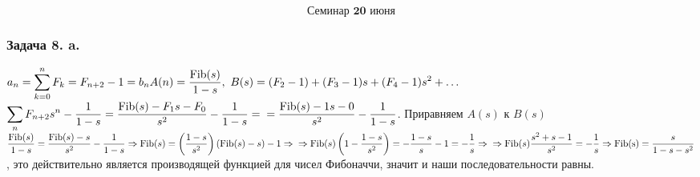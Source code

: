\documentclass[12pt, letterpaper, twoside]{article}
\begin{document}
\[\textbf{Семинар 20 июня}\]
\subsubsection*{Задача 8. a.}
$\displaystyle a_n = \sum_{k = 0}^{n} F_k = F_{n + 2} - 1 = b_n\\
A(n) = \frac{\operatorname{Fib}(s)}{1 - s},\ B(s) = (F_2  - 1) + (F_3 - 1)s + (F_4 - 1)s^2 + \dots$\\
$\displaystyle\sum_{n} F_{n + 2}s^n - \frac{1}{1 - s} = \frac{\operatorname{Fib}(s) - F_1 s - F_0}{s^2} - \frac{1}{1 - s} = \\
= \frac{\operatorname{Fib}(s) - 1s - 0}{s^2} - \frac{1}{1 - s}$. Приравняем $A(s)$ к $B(s)$\\
$\displaystyle \frac{\operatorname{Fib}(s)}{1 - s} = \frac{\operatorname{Fib}(s) - s}{s^2} - \frac{1}{1 - s}\Rightarrow
\operatorname{Fib}(s) = \left( \frac{1 - s}{s^2} \right)(\operatorname{Fib}(s) - s) - 1\Rightarrow\\
\Rightarrow \operatorname{Fib}(s)\left(1-  \frac{1 -s}{s^2}\right) = -\frac{1 - s}{s} - 1 = -\frac{1}{s}\Rightarrow\\
\Rightarrow \operatorname{Fib}(s)\frac{s^2 + s - 1}{s^2} = -\frac{1}{s}\Rightarrow \operatorname{Fib(s)} = \frac{s}{1 - s - s^2}$, это действительно является производящей функцией для чисел Фибоначчи, значит и наши последовательности равны.
\end{document}
